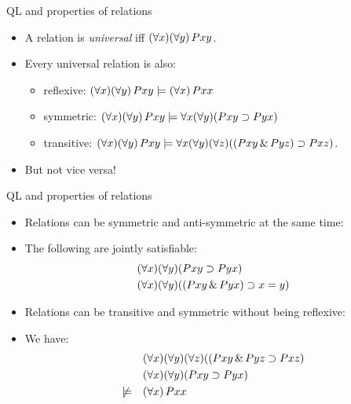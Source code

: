 \begin{frame}{QL and properties of relations}
  \begin{itemize}[<+->]
    \item A relation is \emph{universal} iff $(\forall x)(\forall y)\,Pxy$.
    \item Every universal relation is also:
    \begin{itemize}
      \item reflexive: $(\forall x)(\forall y)\,Pxy \models (\forall x)\,Pxx$
      \item symmetric: $(\forall x)(\forall y)\,Pxy \models \forall
      x(\forall y)(Pxy \supset Pyx)$
      \item transitive: $(\forall x)(\forall y)\,Pxy \models \forall
      x(\forall y)(\forall z)((Pxy \,\&\, Pyz) \supset Pxz)$.
    \end{itemize}
    \item But not vice versa!
  \end{itemize}
\end{frame}

\begin{frame}{QL and properties of relations}
  \begin{itemize}[<+->]
    \item Relations can be symmetric and anti-symmetric at the same time:
    \item The following are jointly satisfiable:
    \begin{align*}
      & (\forall x)(\forall y)(Pxy \supset Pyx)\\
      & (\forall x)(\forall y)((Pxy \,\&\, Pyx) \supset x=y)
    \end{align*}
    \item Relations can be transitive and symmetric without being reflexive:
    \item We have:
    \begin{align*}
      & (\forall x)(\forall y)(\forall z)((Pxy \,\&\, Pyz \supset Pxz)\\
      & (\forall x)(\forall y)(Pxy \supset Pyx)\\
      \not\models\quad & (\forall x)\, Pxx
    \end{align*}
  \end{itemize}
\end{frame}